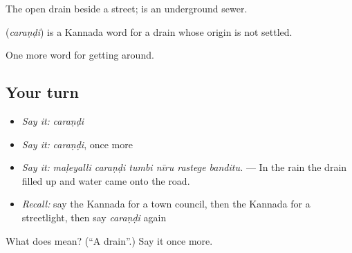 The open drain beside a street;  is an underground sewer.

\begin{cousinweb}
\textbf{} (\emph{caraṇḍi}) is a Kannada word for a drain whose origin is not settled.
\end{cousinweb}

\begin{grammarlens}[title={What you've built}]
One more word for getting around.
\end{grammarlens}

\subsection*{Your turn}
\begin{itemize}
\raggedright
  \item \emph{Say it:} \emph{caraṇḍi}
  \item \emph{Say it:} \emph{caraṇḍi}, once more
  \item \emph{Say it:} \emph{maḷeyalli caraṇḍi tumbi nīru rastege banditu.} — In the rain the drain filled up and water came onto the road.
  \item \emph{Recall:} say the Kannada for a town council, then the Kannada for a streetlight, then say \emph{caraṇḍi} again
\end{itemize}

\begin{tcolorbox}[breakable,colback=teal!4,colframe=teal!35!black,title={Before you move on}]
What does  mean? (\textquotedblleft{}A drain\textquotedblright{}.) Say it once more.
\end{tcolorbox}
